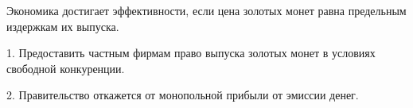 \documentclass[_DKB_p1_Money.tex]{subfiles}
\begin{document}
\begin{frame}{}
\begin{figure}
	\centering
	\begin{overprint}
	\end{overprint}
	\vspace*{-2.5em}
	\caption{}
\end{figure}
\vspace*{-1.5em}
\footnotesize{
	Экономика достигает эффективности, если цена золотых монет равна предельным издержкам их выпуска.
	
	1. Предоставить частным фирмам право выпуска золотых монет в условиях свободной конкуренции.
	
	2. Правительство откажется от монопольной прибыли от эмиссии денег.
}
\end{frame}

\end{document}
